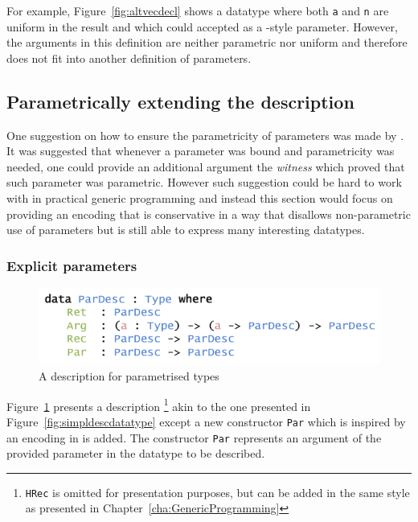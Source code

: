 \documentclass{ituthesis}
\newcommand{\ttconstructor}[1]{\textcolor{constructor-color}{\texttt{#1}}}
\newcommand{\ttvar}[1]{\textcolor{local-var-color}{\texttt{#1}}}
\theoremstyle{break}
\begin{document}
For example, Figure~\ref{fig:altvecdecl} shows a datatype where both \ttvar{a} and \ttvar{n} are uniform in the result and which could accepted as a \citeauthor{norell2009dependently}-style parameter.
However, the arguments in this definition are neither parametric nor uniform and therefore does not fit into another definition of parameters.


\subsection{Parametrically extending the description}
\label{sub:Parametrically extending the description}
One suggestion on how to ensure the parametricity of parameters was made by \textcite{bernardy2011theory}.
It was suggested that whenever a parameter was bound and parametricity was needed, one could provide an additional argument
the \textit{witness} which proved that such parameter was parametric.
However such suggestion could be hard to work with in practical generic programming and instead this section would focus on providing
an encoding that is conservative in a way that disallows non-parametric use of parameters but is still able to express many interesting datatypes.

\subsubsection{Explicit parameters}
\label{ssub:Explicit parameters}

\begin{figure}[ht]
\begin{center}
    \includegraphics[scale=0.5]{Figures/ParDescriptionType.png}
\end{center}
\caption{A description for parametrised types}
\label{fig:pardesc}
\end{figure}

Figure~\ref{fig:pardesc} presents a description
\footnote{\ttconstructor{HRec} is omitted for presentation purposes, but can be added in the same style as presented in Chapter~\ref{cha:GenericProgramming}} 
akin to the one presented in Figure~\ref{fig:simpldescdatatype}
except a new constructor \ttconstructor{Par} which is inspired by an encoding in \textcite{benke2003universes} is added.
The constructor \ttconstructor{Par} represents an argument of the provided parameter in the datatype to be described.
\end{document}
